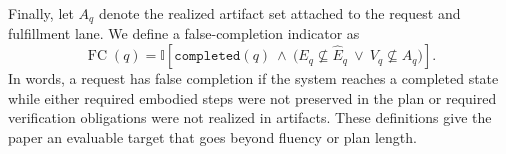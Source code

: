 Finally, let $A_q$ denote the realized artifact set attached to the request and fulfillment lane. We define a false-completion indicator as
\begin{equation}
\operatorname{FC}(q)=
\mathbb{I}\left[
\texttt{completed}(q)\ \land\
\big(E_q \nsubseteq \hat{E}_q\ \lor\ V_q \nsubseteq A_q\big)
\right].
\end{equation}
In words, a request has false completion if the system reaches a completed state while either required embodied steps were not preserved in the plan or required verification obligations were not realized in artifacts. These definitions give the paper an evaluable target that goes beyond fluency or plan length.
